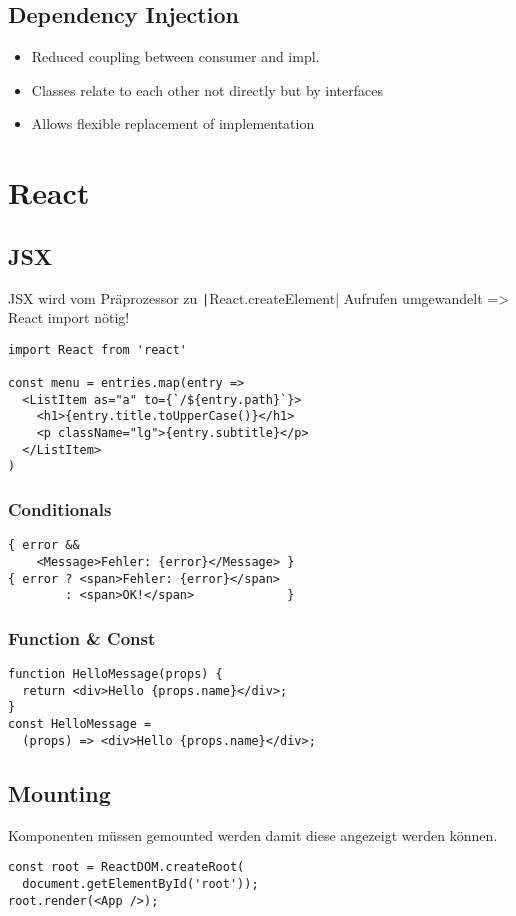 \begin{multicols*}{4}
\subsection{Dependency Injection}
\begin{itemize}
    \item Reduced coupling between consumer and impl.
    \item Classes relate to each other not directly but by interfaces
    \item Allows flexible replacement of implementation
\end{itemize}

\section{React}

\subsection{JSX}
JSX wird vom Präprozessor zu \texttt|React.createElement| Aufrufen umgewandelt => React import nötig!
\begin{verbatim}
import React from 'react'

const menu = entries.map(entry =>
  <ListItem as="a" to={`/${entry.path}`}>
    <h1>{entry.title.toUpperCase()}</h1>
    <p className="lg">{entry.subtitle}</p>
  </ListItem>
)
\end{verbatim}

\subsubsection{Conditionals}
\begin{verbatim}
{ error &&
    <Message>Fehler: {error}</Message> }
{ error ? <span>Fehler: {error}</span>
        : <span>OK!</span>             }
\end{verbatim}

\subsubsection{Function \& Const}
\begin{verbatim}
function HelloMessage(props) {
  return <div>Hello {props.name}</div>;
}
const HelloMessage =
  (props) => <div>Hello {props.name}</div>;
\end{verbatim}

\subsection{Mounting}
Komponenten müssen gemounted werden damit diese angezeigt werden können.
\begin{verbatim}
const root = ReactDOM.createRoot(
  document.getElementById('root'));
root.render(<App />);
\end{verbatim}


\end{multicols*}
